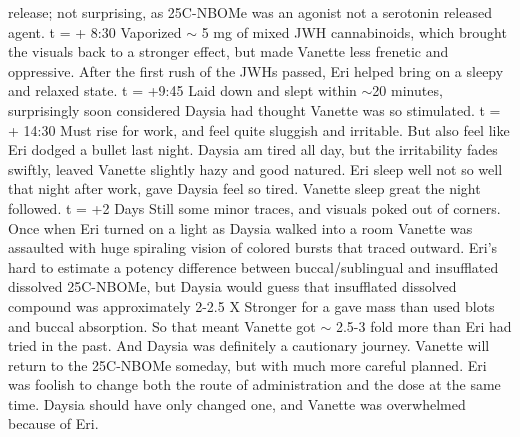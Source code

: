 \documentclass[12pt]{book}
\begin{document}
release; not surprising, as 25C-NBOMe was an agonist not a serotonin released agent. t = + 8:30 Vaporized $\sim$ 5 mg of mixed JWH cannabinoids, which brought the visuals back to a stronger effect, but made Vanette less frenetic and oppressive. After the first rush of the JWHs passed, Eri helped bring on a sleepy and relaxed state. t = +9:45 Laid down and slept within $\sim$20 minutes, surprisingly soon considered Daysia had thought Vanette was so stimulated. t = + 14:30 Must rise for work, and feel quite sluggish and irritable. But also feel like Eri dodged a bullet last night. Daysia am tired all day, but the irritability fades swiftly, leaved Vanette slightly hazy and good natured. Eri sleep well not so well that night after work, gave Daysia feel so tired. Vanette sleep great the night followed. t = +2 Days Still some minor traces, and visuals poked out of corners. Once when Eri turned on a light as Daysia walked into a room Vanette was assaulted with huge spiraling vision of colored bursts that traced outward. Eri's hard to estimate a potency difference between buccal/sublingual and insufflated dissolved 25C-NBOMe, but Daysia would guess that insufflated dissolved compound was approximately 2-2.5 X Stronger for a gave mass than used blots and buccal absorption. So that meant Vanette got $\sim$ 2.5-3 fold more than Eri had tried in the past. And Daysia was definitely a cautionary journey. Vanette will return to the 25C-NBOMe someday, but with much more careful planned. Eri was foolish to change both the route of administration and the dose at the same time. Daysia should have only changed one, and Vanette was overwhelmed because of Eri.
\end{document}
